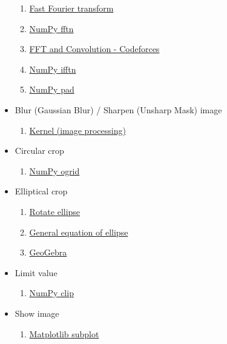 \documentclass[]{article}
\begin{document}
\begin{itemize}
\begin{enumerate}
    \item \href{https://en.wikipedia.org/wiki/Fast_Fourier_transform}{Fast Fourier transform}
    \item \href{https://numpy.org/doc/stable/reference/generated/numpy.fft.fftn.html}{NumPy fftn}
    \item \href{https://codeforces.com/blog/entry/43499}{FFT and Convolution - Codeforces}
    \item \href{https://numpy.org/doc/stable/reference/generated/numpy.fft.ifftn.html#numpy.fft.ifftn}{NumPy ifftn}
    \item \href{https://numpy.org/doc/stable/reference/generated/numpy.pad.html}{NumPy pad}
  \end{enumerate}
  \item Blur (Gaussian Blur) / Sharpen (Unsharp Mask) image
  \begin{enumerate}
    \item \href{https://en.wikipedia.org/wiki/Kernel\_(image\_processing)}{Kernel (image processing)}
  \end{enumerate}
  \item Circular crop
  \begin{enumerate}
    \item \href{https://numpy.org/doc/stable/reference/generated/numpy.ogrid.html}{NumPy ogrid}
  \end{enumerate}
  \item Elliptical crop
  \begin{enumerate}
    \item \href{https://math.stackexchange.com/questions/426150/what-is-the-general-equation-of-the-ellipse-that-is-not-in-the-origin-and-rotate}{Rotate ellipse}
    \item \href{https://www.maa.org/external_archive/joma/Volume8/Kalman/General.html}{General equation of ellipse}
    \item \href{https://geogebra.org/graphing}{GeoGebra}
  \end{enumerate}
  \item Limit value
  \begin{enumerate}
    \item \href{https://numpy.org/doc/stable/reference/generated/numpy.clip.html}{NumPy clip}
  \end{enumerate}
  \item Show image
  \begin{enumerate}
    \item \href{https://matplotlib.org/stable/api/_as_gen/matplotlib.pyplot.subplot.html}{Matplotlib subplot}

\end{enumerate}
\end{itemize}
\end{document}
